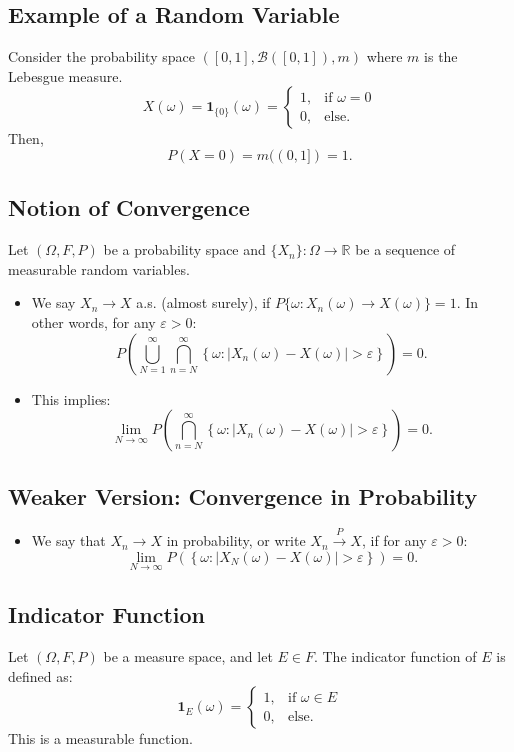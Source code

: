 \documentclass{article}
\begin{document}
\subsection{Example of a Random Variable}
Consider the probability space $([0, 1], \mathcal{B}([0,1]), m)$ where $m$ is the Lebesgue measure.
\[X(\omega) = \mathbf{1}_{\{0\}}(\omega) = 
\begin{cases} 
1, & \text{if } \omega = 0 \\
0, & \text{else}.
\end{cases}
\]
Then,
\[P(X = 0) = m((0, 1]) = 1.\]

\subsection{Notion of Convergence}
Let $(\Omega, F, P)$ be a probability space and $\{X_n\} : \Omega \to \mathbb{R}$ be a sequence of measurable random variables.
\begin{itemize}
    \item We say $X_n \to X$ a.s. (almost surely), if $P\{\omega : X_n(\omega) \to X(\omega)\} = 1$. In other words, for any $\varepsilon > 0$:
    \[    P\left( \bigcup_{N=1}^{\infty} \bigcap_{n=N}^{\infty} \left\{\omega : |X_n(\omega) - X(\omega)| > \varepsilon\right\} \right) = 0.\]
    \item This implies:
    \[    \lim_{N \to \infty} P\left( \bigcap_{n=N}^{\infty} \left\{\omega : |X_n(\omega) - X(\omega)| > \varepsilon\right\} \right) = 0.\]
\end{itemize}

\subsection{Weaker Version: Convergence in Probability}
\begin{itemize}
    \item We say that $X_n \to X$ in probability, or write $X_n \xrightarrow{P} X$, if for any $\varepsilon > 0$:
    \[    \lim_{N \to \infty} P\left(\left\{\omega : |X_N(\omega) - X(\omega)| > \varepsilon\right\}\right) = 0.    \]
\end{itemize}

\subsection{Indicator Function}
Let $(\Omega, F, P)$ be a measure space, and let $E \in F$. The indicator function of $E$ is defined as:
\[
\mathbf{1}_E(\omega) = 
\begin{cases} 
1, & \text{if } \omega \in E \\
0, & \text{else}.
\end{cases}
\]
This is a measurable function.
\end{document}
